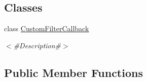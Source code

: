 \subsection*{Classes}
\begin{DoxyCompactItemize}
\item 
class \mbox{\hyperlink{classnjli_1_1_physics_world_1_1_custom_filter_callback}{Custom\+Filter\+Callback}}
\begin{DoxyCompactList}\small\item\em $<$\#\+Description\#$>$ \end{DoxyCompactList}\end{DoxyCompactItemize}
\subsection*{Public Member Functions}
